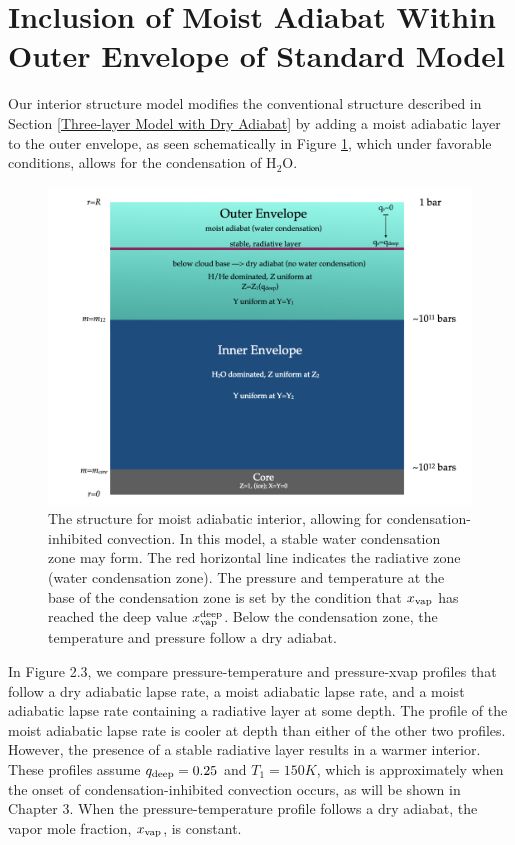 \documentclass[11pt]{ucscthesisbs}
\begin{document}
\section{Inclusion of Moist Adiabat Within Outer Envelope of Standard Model}
Our interior structure model modifies the conventional structure described in Section \ref{Three-layer Model with Dry Adiabat} by adding a moist adiabatic layer to the outer envelope, as seen schematically in Figure \ref{fig:moist_interior}, which under favorable conditions, allows for the condensation of H$_{2}$O. 
\begin{figure}[ht!]
 \centerline{
  \includegraphics[width=6.0in]{figures/structure_schematic/structure_schematic.002.jpeg}
 }
\caption[Interior Structure for Moist Adiabat]
{The structure for moist adiabatic interior, allowing for condensation-inhibited convection. In this model, a stable water condensation zone may form. The red horizontal line indicates the radiative zone (water condensation zone). The pressure and temperature at the base of the condensation zone is set by the condition that $x_{\rm vap}$ has reached the deep value $x_{\rm vap}^{\rm deep}$. Below the condensation zone, the temperature and pressure follow a dry adiabat.}
\label{fig:moist_interior}
\end{figure}

In Figure 2.3, we compare pressure-temperature and pressure-xvap profiles that follow a dry adiabatic lapse rate, a moist adiabatic lapse rate, and a moist adiabatic lapse rate containing a radiative layer at some depth. The profile of the moist adiabatic lapse rate is cooler at depth than either of the other two profiles. However, the presence of a stable radiative layer results in a warmer interior. These profiles assume $q_{\rm deep} = 0.25$ and $T_{1} = 150K$, which is approximately when the onset of condensation-inhibited convection occurs, as will be shown in Chapter 3. When the pressure-temperature profile follows a dry adiabat, the vapor mole fraction, $x_{\rm vap}$, is constant.
\end{document}
